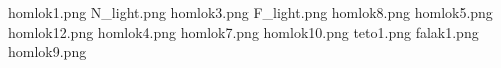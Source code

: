 homlok1.png
N_light.png
homlok3.png
F_light.png
homlok8.png
homlok5.png
homlok12.png
homlok4.png
homlok7.png
homlok10.png
teto1.png
falak1.png
homlok9.png
